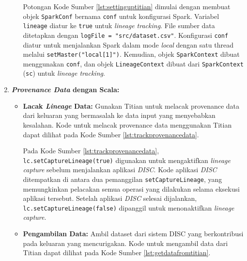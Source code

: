 \begin{enumerate}[topsep=0pt, itemsep=0pt]
\begin{itemize}
      

      Potongan Kode Sumber \ref{lst:settinguptitian} dimulai dengan membuat objek \texttt{SparkConf} bernama \texttt{conf} untuk konfigurasi Spark. Variabel \texttt{lineage} diatur ke \texttt{true} untuk \emph{lineage tracking}. File sumber data ditetapkan dengan \texttt{logFile = "src/dataset.csv"}. Konfigurasi \texttt{conf} diatur untuk menjalankan Spark dalam mode \emph{local} dengan satu thread melalui \texttt{setMaster("local[1]")}. Kemudian, objek \texttt{SparkContext} dibuat menggunakan \texttt{conf}, dan objek \texttt{LineageContext} dibuat dari \texttt{SparkContext} (\texttt{sc}) untuk \emph{lineage tracking}.


  \end{itemize}


  
  
  \item \textbf{\emph{Provenance Data} dengan Scala:}
  \begin{itemize}

    \item \textbf{Lacak \emph{Lineage} Data:} Gunakan Titian untuk melacak provenance data dari keluaran yang bermasalah ke data input yang menyebabkan kesalahan.
    Kode untuk melacak provenance data menggunakan Titian dapat dilihat pada Kode Sumber \ref{lst:trackprovenancedata}.

    

    Pada Kode Sumber \ref{lst:trackprovenancedata}, \texttt{lc.setCaptureLineage(true)} digunakan untuk mengaktifkan \emph{lineage capture} sebelum menjalankan aplikasi \emph{DISC}. Kode aplikasi \emph{DISC} ditempatkan di antara dua pemanggilan \texttt{setCaptureLineage}, yang memungkinkan pelacakan semua operasi yang dilakukan selama eksekusi aplikasi tersebut. Setelah aplikasi \emph{DISC} selesai dijalankan, \texttt{lc.setCaptureLineage(false)} dipanggil untuk menonaktifkan \emph{lineage capture}.


      \item \textbf{Pengambilan Data:} Ambil dataset dari sistem DISC yang berkontribusi pada keluaran yang mencurigakan.
      Kode untuk mengambil data dari Titian dapat dilihat pada Kode Sumber \ref{lst:getdatafromtitian}.


\end{itemize}
\end{enumerate}
